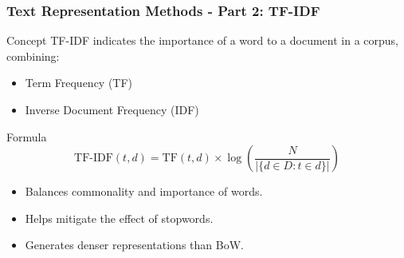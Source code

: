 \documentclass[aspectratio=169]{beamer}
\begin{document}
\begin{frame}[fragile]
    \frametitle{Text Representation Methods - Part 2: TF-IDF}
    \begin{block}{Concept}
        TF-IDF indicates the importance of a word to a document in a corpus, combining:
        \begin{itemize}
            \item Term Frequency (TF)
            \item Inverse Document Frequency (IDF)
        \end{itemize}
    \end{block}

    \begin{block}{Formula}
        \begin{equation}
        \text{TF-IDF}(t, d) = \text{TF}(t, d) \times \log\left(\frac{N}{|\{d \in D: t \in d\}|}\right)
        \end{equation}
    \end{block}

    \begin{itemize}
        \item Balances commonality and importance of words.
        \item Helps mitigate the effect of stopwords.
        \item Generates denser representations than BoW.
    \end{itemize}
\end{frame}
\end{document}
